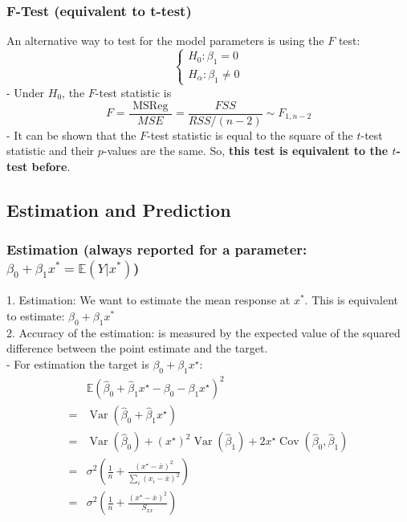 \documentclass[11pt,a4paper]{article}
\begin{document}
\subsubsection{F-Test (equivalent to t-test)}
An alternative way to test for the model parameters is using the $F$ test:
$$
\left\{\begin{array}{l}
H_{0}: \beta_{1}=0 \\
H_{\alpha}: \beta_{1} \neq 0
\end{array}\right.
$$
- Under $H_{0}$, the $F$-test statistic is
$$
F=\frac{\text { MSReg }}{M S E}=\frac{F S S}{R S S /(n-2)} \sim F_{1, n-2}
$$
- It can be shown that the $F$-test statistic is equal to the square of the $t$-test statistic and their $p$-values are the same. So, \textbf{this test is equivalent to the $t$-test before}.

\subsection{Estimation and Prediction}

\subsubsection{Estimation (always reported for a parameter: ${\beta}_0+{\beta}_1x^*=\mathbb{E}(Y|x^*)$)}
1. Estimation: We want to estimate the mean response at $x^*$. This is equivalent to estimate: $\beta_0+\beta_1x^*$\\
2. Accuracy of the estimation: is measured by the expected value of the squared difference between the point estimate and the target.\\
- For estimation the target is $\beta_{0}+\beta_{1} x^{\star}:$
$$
\begin{aligned}
& \mathbb{E}\left(\hat{\beta}_{0}+\hat{\beta}_{1} x^{\star}-\beta_{0}-\beta_{1} x^{\star}\right)^{2} \\
=& \operatorname{Var}\left(\hat{\beta}_{0}+\hat{\beta}_{1} x^{\star}\right) \\
=& \operatorname{Var}\left(\hat{\beta}_{0}\right)+\left(x^{\star}\right)^{2} \operatorname{Var}\left(\hat{\beta}_{1}\right)+2 x^{\star} \operatorname{Cov}\left(\hat{\beta}_{0}, \hat{\beta}_{1}\right) \\
=& \sigma^{2}\left(\frac{1}{n}+\frac{\left(x^{\star}-\bar{x}\right)^{2}}{\sum_{i}\left(x_{i}-\bar{x}\right)^{2}}\right) \\
=& \sigma^{2}\left(\frac{1}{n}+\frac{\left(x^{\star}-\bar{x}\right)^{2}}{S_{x x}}\right)
\end{aligned}
$$
\end{document}

